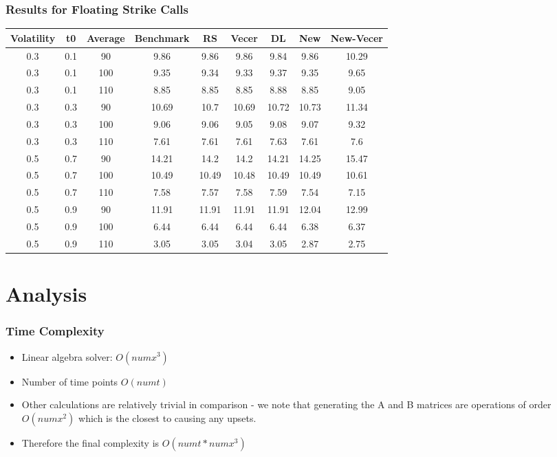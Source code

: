 \documentclass{beamer}
\begin{document}
  \begin{frame}
    \frametitle{Results for Floating Strike Calls}
    \scriptsize
    \begin{table}[h]
      \begin{tabular}{|c|c|c|c|c|c|c|c|c|}
      \hline
      Volatility & t0 & Average & Benchmark & RS & Vecer & DL & New & New-Vecer \\
      \hline
      0.3 & 0.1 & 90 & 9.86 & 9.86 & 9.86 & 9.84 & 9.86 & 10.29 \\
      0.3 & 0.1 & 100 & 9.35 & 9.34 & 9.33 & 9.37 & 9.35 & 9.65 \\
      0.3 & 0.1 & 110 & 8.85 & 8.85 & 8.85 & 8.88 & 8.85 & 9.05 \\
      0.3 & 0.3 & 90 & 10.69 & 10.7 & 10.69 & 10.72 & 10.73 & 11.34 \\
      0.3 & 0.3 & 100 & 9.06 & 9.06 & 9.05 & 9.08 & 9.07 & 9.32 \\
      0.3 & 0.3 & 110 & 7.61 & 7.61 & 7.61 & 7.63 & 7.61 & 7.6 \\
      0.5 & 0.7 & 90 & 14.21 & 14.2 & 14.2 & 14.21 & 14.25 & 15.47 \\
      0.5 & 0.7 & 100 & 10.49 & 10.49 & 10.48 & 10.49 & 10.49 & 10.61 \\
      0.5 & 0.7 & 110 & 7.58 & 7.57 & 7.58 & 7.59 & 7.54 & 7.15 \\
      0.5 & 0.9 & 90 & 11.91 & 11.91 & 11.91 & 11.91 & 12.04 & 12.99 \\
      0.5 & 0.9 & 100 & 6.44 & 6.44 & 6.44 & 6.44 & 6.38 & 6.37 \\
      0.5 & 0.9 & 110 & 3.05 & 3.05 & 3.04 & 3.05 & 2.87 & 2.75 \\
      \hline
      \end{tabular}
    \end{table}
  \end{frame}

  \section{Analysis}

  \begin{frame}
    \frametitle{Time Complexity}
    \begin{itemize}
      \item Linear algebra solver: \(O(numx^3)\)
      \item Number of time points \(O(numt)\)
      \item Other calculations are relatively trivial in comparison - we note that generating the A and B matrices are operations of order \(O(numx^2)\) which is the closest to causing any upsets.
      \item Therefore the final complexity is \(O(numt * numx^3)\)
    \end{itemize}
  \end{frame}
\end{document}
